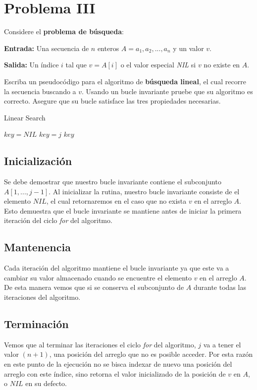 \section{Problema III}
Considere el \textbf{problema de búsqueda}:
    
\textbf{Entrada:} Una secuencia de $n$ enteros $A = {a_1, a_2, ..., a_n}$ y un valor $v$.

\textbf{Salida:} Un índice $i$ tal que $v = A[i]$ o el valor especial \textit{NIL} si $v$ no existe en $A$.

Escriba un pseudocódigo para el algoritmo de \textbf{búsqueda lineal}, el cual recorre la secuencia buscando a $v$. Usando un bucle invariante pruebe que su algoritmo es correcto. Asegure que su bucle satisface las tres propiedades necesarias.

\begin{algorithm}[H]
    \caption{Linear Search}\label{alg:linear_search}
    \begin{algorithmic}[1]
            \State $key = NIL$
                    \State $key = j$
                \EndIf\label{linear_search_if}
            \EndFor\label{isort_for}
            \Return $key$
        \EndProcedure
    \end{algorithmic}
\end{algorithm}

\subsection{Inicialización}
Se debe demostrar que nuestro bucle invariante contiene el subconjunto $A[1, ..., j-1]$. Al inicializar la rutina, nuestro bucle invariante consiste de el elemento $NIL$, el cual retornaremos en el caso que no exista $v$ en el arreglo $A$. Esto demuestra que el bucle invariante se mantiene antes de iniciar la primera iteración del ciclo \textit{for} del algoritmo.

\subsection{Mantenencia}
Cada iteración del algoritmo mantiene el bucle invariante ya que este va a cambiar su valor almacenado cuando se encuentre el elemento $v$
 en el arreglo $A$. De esta manera vemos que si se conserva el subconjunto de $A$ durante todas las iteraciones del algoritmo.
 
\subsection{Terminación}
Vemos que al terminar las iteraciones el ciclo \textit{for} del algoritmo, $j$ va a tener el valor $(n+1)$, una posición del arreglo que no es posible acceder. Por esta razón en este punto de la ejecución no se bisca indexar de nuevo una posición del arreglo con este índice, sino retorna el valor inicializado de la posición de $v$ en $A$, o $NIL$ en su defecto.